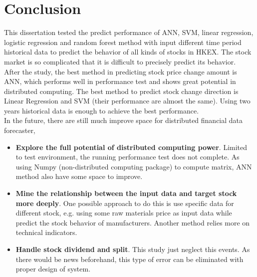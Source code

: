\chapter{Conclusion}
\label{ch:conclusion}

This dissertation tested the predict performance of ANN, SVM, linear regression, logistic regression and random forest method with input different time period historical data to predict the behavior of all kinds of stocks in HKEX. The stock market is so complicated that it is difficult to precisely predict its behavior.\\


After the study, the best method in predicting stock price change amount is ANN, which performs well in performance test and shows great potential in distributed computing. The best method to predict stock change direction is Linear Regression and SVM (their performance are almost the same). Using two years historical data is enough to achieve the best performance. \\


In the future, there are still much improve space for distributed financial data forecaster,
\begin{itemize}
	\item \textbf{Explore the full potential of distributed computing power}. Limited to test environment, the running performance test does not complete. As using Numpy (non-distributed computing package) to compute matrix, ANN method also have some space to improve.
	\item \textbf{Mine the relationship between the input data and target stock more deeply}. One possible approach to do this is use specific data for different stock, e.g. using some raw materials price as input data while predict the stock behavior of manufacturers. Another method relies more on technical indicators.
	\item \textbf{Handle stock dividend and split}. This study just neglect this events. As there would be news beforehand, this type of error can be eliminated with proper design of system.
\end{itemize}